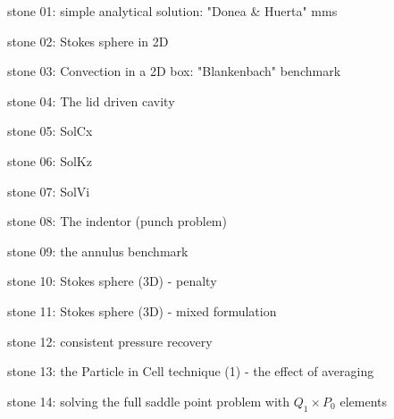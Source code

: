 

\vspace{1cm}

{\small 

\noindent stone 01: simple analytical solution: "Donea \& Huerta" mms 


\noindent stone 02: Stokes sphere in 2D 


\noindent stone 03: Convection in a 2D box: "Blankenbach" benchmark \cite{blbc89}


\noindent stone 04: The lid driven cavity


\noindent stone 05: SolCx


\noindent stone 06: SolKz


\noindent stone 07: SolVi


\noindent stone 08: The indentor (punch problem) 


\noindent stone 09: the annulus benchmark 


\noindent stone 10: Stokes sphere (3D) - penalty


\noindent stone 11: Stokes sphere (3D) - mixed formulation


\noindent stone 12: consistent pressure recovery 


\noindent stone 13: the Particle in Cell technique (1) - the effect of averaging


\noindent stone 14: solving the full saddle point problem with $Q_1\times P_0$ elements 


}
